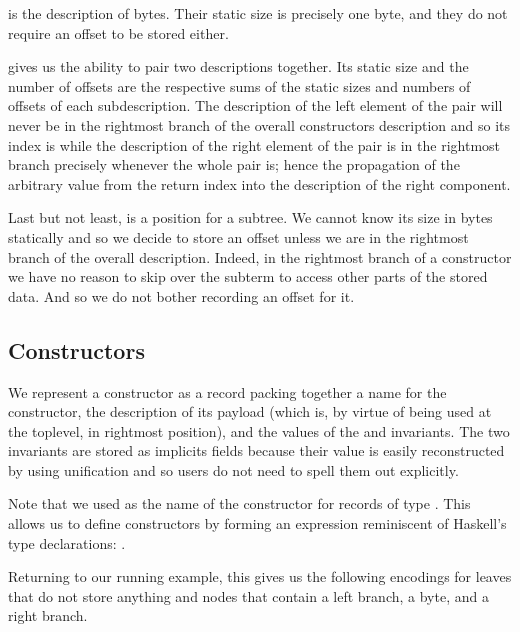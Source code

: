  is the description of bytes.
%
Their static size is precisely one byte, and they do not require an
offset to be stored either.

 gives us the ability to pair two descriptions together.
Its static size and the number of offsets are the respective sums of the
static sizes and numbers of offsets of each subdescription.
%
The description of the left element of the pair will never be in the
rightmost branch of the overall constructors description and so its
index is  while the description of the right element
of the pair is in the rightmost branch precisely whenever the whole pair
is; hence the propagation of the  arbitrary value from the
return index into the description of the right component.

Last but not least,  is a position for a subtree.
We cannot know its size in bytes statically and so we decide to store
an offset unless we are in the rightmost branch of the overall description.
%
Indeed, in the rightmost branch of a constructor we have no reason to
skip over the subterm to access other parts of the stored data. And so we
do not bother recording an offset for it.


\subsection{Constructors}

We represent a constructor as a record packing together
a name for the constructor,
the description of its payload (which is, by virtue of
being used at the toplevel, in rightmost position),
and the values of the  and
 invariants.
%
The two invariants are stored as implicits fields
because their value is easily reconstructed by \idris{}
using unification and so users do not need
to spell them out explicitly.


Note that we used \IdrisData{(::)} as the name of the
constructor for records of type .
This allows us to define constructors by forming an
expression reminiscent of Haskell's type declarations:
 \IdrisData{::} .

Returning to our running example, this gives us the following encodings for
leaves that do not store anything
and nodes that contain a left branch, a byte, and a right branch.

